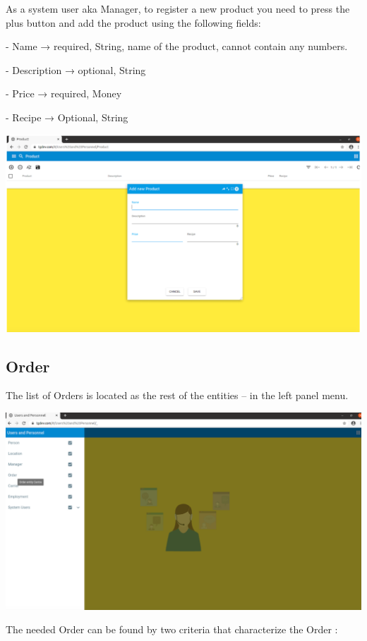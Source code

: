 As a system user aka Manager, to register a new product you need to press the plus button and add the product using the following fields:

- Name → required, String, name of the product, cannot contain any numbers.

- Description → optional, String

- Price → required, Money

- Recipe → Optional, String

\includegraphics[width=\textwidth]{sections/01-chapter/images/product2.png}

\subsection{Order}

The list of Orders is located as the rest of the entities -- in the left panel menu. 

\includegraphics[width=\textwidth]{sections/01-chapter/images/order1.png}

The needed Order can be found by two criteria that characterize the Order : 

